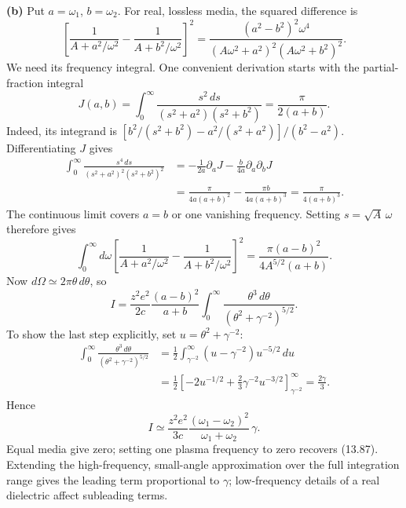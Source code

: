 \textbf{(b)} Put $a=\omega_1$, $b=\omega_2$. For real, lossless media,
the squared difference is
\[
 \left[\frac1{A+a^2/\omega^2}
       -\frac1{A+b^2/\omega^2}\right]^2
 =\frac{(a^2-b^2)^2\omega^4}
 {(A\omega^2+a^2)^2(A\omega^2+b^2)^2}.
\]
We need its frequency integral. One convenient derivation starts with
the partial-fraction integral
\[
 J(a,b)=\int_0^\infty
       \frac{s^2\,ds}{(s^2+a^2)(s^2+b^2)}
 =\frac{\pi}{2(a+b)}.
\]
Indeed, its integrand is
$[b^2/(s^2+b^2)-a^2/(s^2+a^2)]/(b^2-a^2)$.
Differentiating $J$ gives
\[
 \begin{split}
 \int_0^\infty\frac{s^4\,ds}
 {(s^2+a^2)^2(s^2+b^2)^2}
 &=-\frac1{2a}\partial_aJ
   -\frac b{4a}\partial_a\partial_bJ\\
 &=\frac{\pi}{4a(a+b)^2}
   -\frac{\pi b}{4a(a+b)^3}
 =\frac{\pi}{4(a+b)^3}.
 \end{split}
\]
The continuous limit covers $a=b$ or one vanishing frequency.
Setting $s=\sqrt A\,\omega$ therefore gives
\[
 \int_0^\infty d\omega
 \left[\frac1{A+a^2/\omega^2}
       -\frac1{A+b^2/\omega^2}\right]^2
 =\frac{\pi(a-b)^2}{4A^{5/2}(a+b)}.
\]
Now $d\Omega\simeq2\pi\theta\,d\theta$, so
\[
 I=\frac{z^2e^2}{2c}\frac{(a-b)^2}{a+b}
       \int_0^\infty
       \frac{\theta^3\,d\theta}{(\theta^2+\gamma^{-2})^{5/2}}.
\]
To show the last step explicitly, set $u=\theta^2+\gamma^{-2}$:
\[
 \begin{split}
 \int_0^\infty
       \frac{\theta^3\,d\theta}{(\theta^2+\gamma^{-2})^{5/2}}
 &=\frac12\int_{\gamma^{-2}}^\infty
       (u-\gamma^{-2})u^{-5/2}\,du\\
 &=\frac12\left[-2u^{-1/2}
       +\frac23\gamma^{-2}u^{-3/2}\right]_{\gamma^{-2}}^\infty
 =\frac{2\gamma}{3}.
 \end{split}
\]
Hence
\[
 \boxed{I\simeq\frac{z^2e^2}{3c}
       \frac{(\omega_1-\omega_2)^2}{\omega_1+\omega_2}\,\gamma.}
\]
Equal media give zero; setting one plasma frequency to zero recovers
(13.87). Extending the high-frequency, small-angle approximation over
the full integration range gives the leading term proportional to
$\gamma$; low-frequency details of a real dielectric affect subleading
terms.





